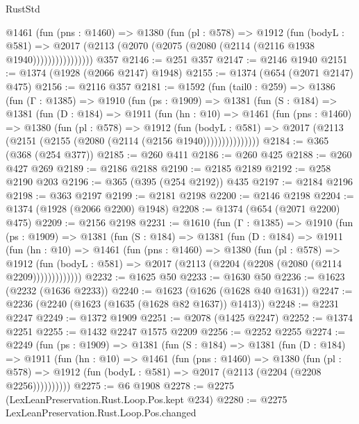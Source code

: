 \begin{lexlean}{RustStd}
\begin{coremodule}
                @1461
                  (fun (pns : @1460) =>
                  @1380
                    (fun (pl : @578) =>
                    @1912
                      (fun (bodyL : @581) =>
                      @2017 (@2113 (@2070 (@2075 (@2080 (@2114 (@2116 @1938 @1940))))))))))))))))
    @357
@2146 := @251 @357
@2147 := @2146 @1940
@2151 := @1374 (@1928 (@2066 @2147) @1948)
@2155 := @1374 (@654 (@2071 @2147) @475)
@2156 := @2116 @357
@2181 := @1592
    (fun (tail0 : @259) =>
    @1386
      (fun (Γ : @1385) =>
      @1910
        (fun (ps : @1909) =>
        @1381
          (fun (S : @184) =>
          @1381
            (fun (D : @184) =>
            @1911
              (fun (hn : @10) =>
              @1461
                (fun (pns : @1460) =>
                @1380
                  (fun (pl : @578) =>
                  @1912
                    (fun (bodyL : @581) =>
                    @2017 (@2113 (@2151 (@2155 (@2080 (@2114 (@2156 @1940)))))))))))))))
@2184 := @365 (@368 (@254 @377))
@2185 := @260 @411
@2186 := @260 @425
@2188 := @260 @427 @269
@2189 := @2186 @2188
@2190 := @2185 @2189
@2192 := @258 @2190 @203
@2196 := @365 (@395 (@254 @2192)) @435
@2197 := @2184 @2196
@2198 := @363 @2197
@2199 := @2181 @2198
@2200 := @2146 @2198
@2204 := @1374 (@1928 (@2066 @2200) @1948)
@2208 := @1374 (@654 (@2071 @2200) @475)
@2209 := @2156 @2198
@2231 := @1610
    (fun (Γ : @1385) =>
    @1910
      (fun (ps : @1909) =>
      @1381
        (fun (S : @184) =>
        @1381
          (fun (D : @184) =>
          @1911
            (fun (hn : @10) =>
            @1461
              (fun (pns : @1460) =>
              @1380
                (fun (pl : @578) =>
                @1912
                  (fun (bodyL : @581) => @2017 (@2113 (@2204 (@2208 (@2080 (@2114 @2209)))))))))))))
@2232 := @1625 @50
@2233 := @1630 @50
@2236 := @1623 (@2232 (@1636 @2233))
@2240 := @1623 (@1626 (@1628 @40 @1631))
@2247 := @2236 (@2240 (@1623 (@1635 (@1628 @82 @1637)) @1413))
@2248 := @2231 @2247
@2249 := @1372 @1909
@2251 := @2078 (@1425 @2247)
@2252 := @1374 @2251
@2255 := @1432 @2247 @1575 @2209
@2256 := @2252 @2255
@2274 := @2249
    (fun (ps : @1909) =>
    @1381
      (fun (S : @184) =>
      @1381
        (fun (D : @184) =>
        @1911
          (fun (hn : @10) =>
          @1461
            (fun (pns : @1460) =>
            @1380
              (fun (pl : @578) =>
              @1912 (fun (bodyL : @581) => @2017 (@2113 (@2204 (@2208 @2256))))))))))
@2275 := @6 @1908
@2278 := @2275 (LexLeanPreservation.Rust.Loop.Pos.kept @234)
@2280 := @2275 LexLeanPreservation.Rust.Loop.Pos.changed

\end{coremodule}
\end{lexlean}
